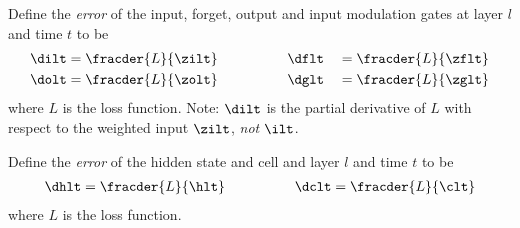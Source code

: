 \begin{definition}
Define the \emph{error} of the input, forget, output and input modulation gates at layer $l$ and time $t$ to be
\begin{alignat*}{2}
\dilt &= \fracder{L}{\zilt} \hspace{50pt}
\dflt &&= \fracder{L}{\zflt} \\
\dolt &= \fracder{L}{\zolt} \hspace{50pt}
\dglt &&= \fracder{L}{\zglt} 
\end{alignat*}
where $L$ is the loss function. Note: $\dilt$ is the partial derivative of $L$ with respect to the weighted input $\zilt$, \emph{not} $\ilt$.
\end{definition}

\begin{definition}
Define the \emph{error} of the hidden state and cell and layer $l$ and time $t$ to be
\begin{align}
\dhlt = \fracder{L}{\hlt} \hspace{50pt} \dclt = \fracder{L}{\clt}
\end{align}
where $L$ is the loss function.
\end{definition}


